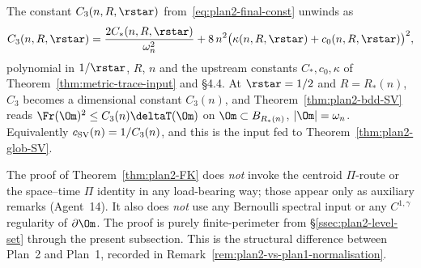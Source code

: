 \begin{remark}
\label{rem:plan2-rho-star-fix}
The constant $C_3(n,R,\rstar)$ from~\eqref{eq:plan2-final-const}
unwinds as
\[
   C_3(n,R,\rstar)
   =\frac{2C_*(n,R,\rstar)}{\omega_n^{2}}
    +8\,n^{2}\bigl(\kappa(n,R,\rstar)+c_0(n,R,\rstar)\bigr)^{2},
\]
polynomial in $1/\rstar$, $R$, $n$ and the upstream constants
$C_*,c_0,\kappa$ of Theorem~\ref{thm:metric-trace-input} and \S4.4.
At $\rstar=1/2$ and $R=R_*(n)$, $C_3$ becomes a dimensional constant
$C_3(n)$, and Theorem~\ref{thm:plan2-bdd-SV} reads
$\Fr(\Om)^{2}\le C_3(n)\deltaT(\Om)$ on
$\Om\subset B_{R_*(n)}$, $|\Om|=\omega_n$. Equivalently
$c_{\rm SV}(n)=1/C_3(n)$, and this is the input fed to
Theorem~\ref{thm:plan2-glob-SV}.
\end{remark}

\begin{remark}
\label{rem:plan2-no-conditional}
The proof of Theorem~\ref{thm:plan2-FK} does \emph{not} invoke
the centroid $\Pi$-route or the space--time $\Pi$ identity in any
load-bearing way; those appear only as auxiliary remarks
(Agent~14). It also does \emph{not} use any Bernoulli spectral input
or any $C^{1,\gamma}$ regularity of $\partial\Om$. The proof is
purely finite-perimeter from \S\ref{ssec:plan2-level-set} through
the present subsection. This is the structural difference between
Plan~2 and Plan~1, recorded in
Remark~\ref{rem:plan2-vs-plan1-normalisation}.
\end{remark}
